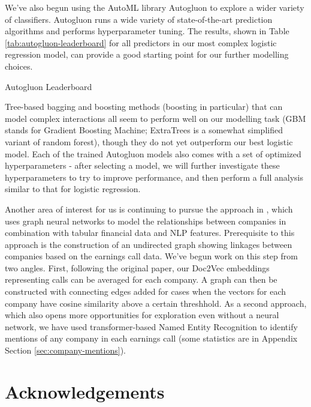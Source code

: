 \documentclass{article}[11pt]
\begin{document}
    We've also begun using the AutoML library Autogluon to explore a wider variety of classifiers. Autogluon runs a wide variety of state-of-the-art prediction algorithms and performs hyperparameter tuning. The results, shown in Table \ref{tab:autogluon-leaderboard} for all predictors in our most complex logistic regression model, can provide a good starting point for our further modelling choices.

    \begin{table}[h!]
        \centering
        \caption{Autogluon Leaderboard}
        
        \label{tab:autogluon-leaderboard}
    \end{table}

    Tree-based bagging and boosting methods (boosting in particular) that can model complex interactions all seem to perform well on our modelling task (GBM stands for Gradient Boosting Machine; ExtraTrees is a somewhat simplified variant of random forest), though they do not yet outperform our best logistic model. Each of the trained Autogluon models also comes with a set of optimized hyperparameters - after selecting a model, we will further investigate these hyperparameters to try to improve performance, and then perform a full analysis similar to that for logistic regression.

    Another area of interest for us is continuing to pursue the approach in \cite{das_credit_2023}, which uses graph neural networks to model the relationships between companies in combination with tabular financial data and NLP features. Prerequisite to this approach is the construction of an undirected graph showing linkages between companies based on the earnings call data. We've begun work on this step from two angles. First, following the original paper, our Doc2Vec embeddings representing calls can be averaged for each company. A graph can then be constructed with connecting edges added for cases when the vectors for each company have cosine similarity above a certain threshhold. As a second approach, which also opens more opportunities for exploration even without a neural network, we have used transformer-based Named Entity Recognition to identify mentions of any company in each earnings call (some statistics are in Appendix Section \ref{sec:company-mentions}).
    
    \section*{Acknowledgements}
\end{document}
